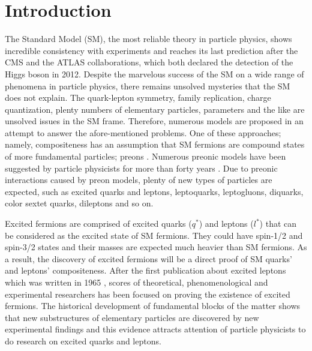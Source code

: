 \documentclass{appolb}
\begin{document}
\section{\label{sec:int}Introduction}
The Standard Model (SM), the most reliable theory in particle physics,  shows incredible consistency with experiments and reaches its last prediction after the CMS and the ATLAS collaborations, which both declared the detection of the Higgs boson \cite{cms2012, atlas2012} in 2012.
Despite the marvelous success of the SM on a wide range of phenomena in particle physics, there remains unsolved mysteries that the SM does not explain. The quark-lepton symmetry, family replication, charge quantization,  plenty numbers of elementary particles, parameters and the like are unsolved issues  in the SM frame. Therefore, numerous models are proposed in an attempt to answer the afore-mentioned problems. One of  these approaches; namely, compositeness has an assumption that SM fermions are compound states of more fundamental particles; preons \cite{pati1974,dsouza1992}. Numerous preonic models have been suggested by particle physicists for more than forty years \cite{shupe1979, harari1979,terazawa1980,terazawa1982,terazawa1983,eichten1983, fritzsch1981, celikel1998, desouza2008, fritzsch2016}. Due to preonic interactions caused by preon models, plenty of  new types of particles are expected, such as  excited quarks and leptons, leptoquarks, leptogluons, diquarks, color sextet quarks, dileptons and so on. 


Excited fermions are comprised of  excited quarks ($q^*$) and leptons ($l^*$) that can be considered as the excited state of  SM fermions. They could have spin-1/2 and spin-3/2 states and their masses are expected much heavier than  SM fermions. As a result, the discovery of excited fermions will be a direct proof of  SM quarks' and leptons' compositeness. After the first publication about excited leptons which was written in 1965 \cite{low1965}, scores of theoretical, phenomenological \cite{renard1983,kuhn1984, pancheri1984, rujula1984, hagiwara1985, kuhn1985, baur1987, spira1989, baur1990, boudjema1993,cakir1999,cakir2000,cakir2001, eboli2002, cakir2004, ccakir2004,cakir2008,caliskan2017, caliskan2017exc} and experimental \cite{cdf1995,h1_2000,l3_2000,chekanov2002,abdallah2006,cms2014,atlas2016photon,atlas2016,atlas2017,cms2016,cms2016photon,cms2017,cms2017eej} researchers has been focused on  proving the existence of  excited fermions. The historical development of fundamental blocks of the matter \cite{sahin2011} shows that new substructures of elementary particles are discovered by new experimental findings and this evidence attracts attention of  particle physicists to do research on  excited quarks and leptons.       
\end{document}
